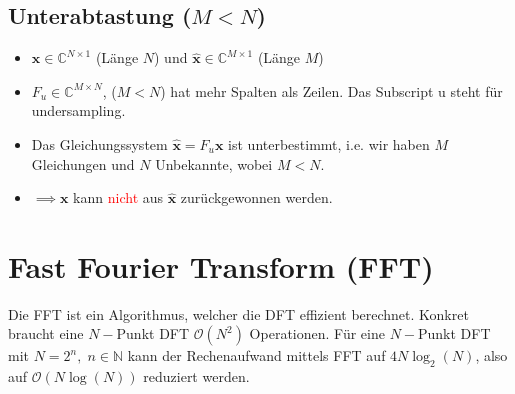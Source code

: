 \documentclass[11pt]{article}
\begin{document}
\vspace*{-0.25cm}
\subsection*{Unterabtastung ($M < N$)}
\vspace*{-0.5cm}
\begin{itemize}
    \item $\mathbf{x} \in \mathbb{C}^{N \times 1}$ (Länge $N$) und $\hat{\mathbf{x}} \in \mathbb{C}^{M \times 1}$ (Länge $M$)
    \item $F_u \in \mathbb{C}^{M\times N}$, ($M < N$) hat mehr Spalten als Zeilen. Das Subscript u steht für undersampling.
    \item Das Gleichungssystem $\hat{\mathbf{x}} = F_u \mathbf{x}$ ist unterbestimmt, i.e. wir haben $M$ Gleichungen und $N$ Unbekannte, wobei $M < N$.
    \item[] $\implies \mathbf{x}$ kann \textcolor{red}{nicht} aus $\hat{\mathbf{x}}$ zurückgewonnen werden.
\end{itemize}


\vfill \null
\pagebreak

\section*{Fast Fourier Transform (FFT)}
\vspace*{-0.5cm}
Die FFT ist ein Algorithmus, welcher die DFT effizient berechnet. Konkret braucht eine $N-$Punkt DFT $\mathcal{O}(N^2)$ Operationen. Für eine $N-$Punkt DFT mit $N=2^n, \; n \in \mathbb{N}$ kann der Rechenaufwand mittels FFT auf $4N \log_2(N)$, also auf $\mathcal{O}(N\log(N))$ reduziert werden.

\end{document}
